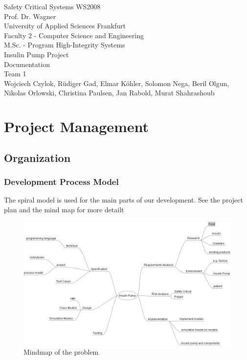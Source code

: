 \documentclass[pdflatex,a4paper,11pt,english]{scrreprt}
\begin{document}
\begin{titlepage}
\vspace*{4cm}
\begin{center}
\Large
Safety Critical Systems WS2008\\
Prof. Dr. Wagner\\
\vspace{4cm}
\normalsize
University of Applied Sciences Frankfurt\\
Faculty 2 - Computer Science and Engineering\\
M.Sc. - Program High-Integrity Systems\\
\vspace{2cm}
Insulin Pump Project\\
Documentation\\
Team 1\\
\vspace{2cm}
Wojciech Czylok, Rüdiger Gad, Elmar Köhler, Solomon Nega, Beril Olgun,\\
Nikolas Orlowski, Christina Paulsen, Jan Rabold, Murat Shahrashoub
\end{center}
\end{titlepage}

\tableofcontents

\listoffigures


\chapter{Project Management}
\section{Organization}
\subsection{Development Process Model}
The spiral model is used for the main parts of our development.
See the project plan and the mind map for more detailt

\begin{figure}[htb]
\centering
\includegraphics[width=\textwidth]{images/Insulin_Pump_Mindmap.png}
\caption{
Mindmap of the problem
\label{fig:mindmap}
}
\end{figure}
\end{document}
